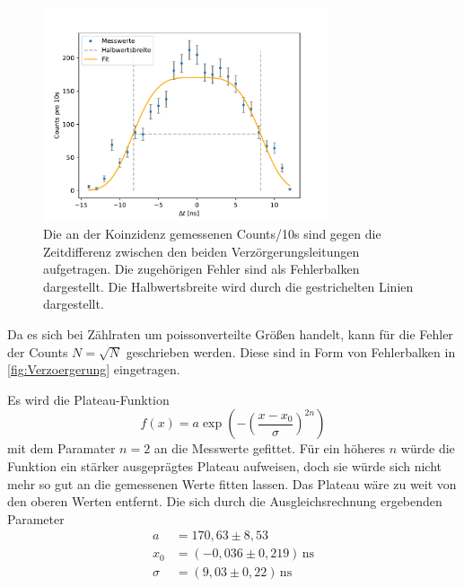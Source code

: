         \begin{figure}[h]
            \centering
            \includegraphics[width = 0.75\textwidth]{plots/Verzoergerung.pdf}
            \caption{Die an der Koinzidenz gemessenen Counts/10s sind gegen die Zeitdifferenz zwischen den beiden Verzörgerungsleitungen aufgetragen. Die zugehörigen Fehler sind als Fehlerbalken dargestellt. Die Halbwertsbreite wird durch die gestrichelten Linien dargestellt.}
            \label{fig:Verzoergerung}
        \end{figure}

        \FloatBarrier

        Da es sich bei Zählraten um poissonverteilte Größen handelt, kann für die Fehler der Counts $N = \sqrt{N}$ geschrieben werden. Diese sind in Form von Fehlerbalken in \autoref{fig:Verzoergerung} eingetragen.

        Es wird die Plateau-Funktion
        \begin{equation*}
            f(x) = a \exp\left(-\left(\frac{x - x_0}{\sigma}\right)^{2 n}\right)
        \end{equation*}
        mit dem Paramater $n = 2$ an die Messwerte gefittet.
        Für ein höheres $n$ würde die Funktion ein stärker ausgeprägtes Plateau aufweisen, doch sie würde sich nicht mehr so gut an die gemessenen Werte fitten lassen. Das Plateau wäre zu weit von den oberen Werten entfernt.
        Die sich durch die Ausgleichsrechnung ergebenden Parameter
        \begin{align*}
            a &= 170,63 \pm 8,53 \\
            x_0 &= (-0,036 \pm 0,219) \, \text{ns} \\
            \sigma &= (9,03 \pm 0,22) \, \text{ns}
        \end{align*}

